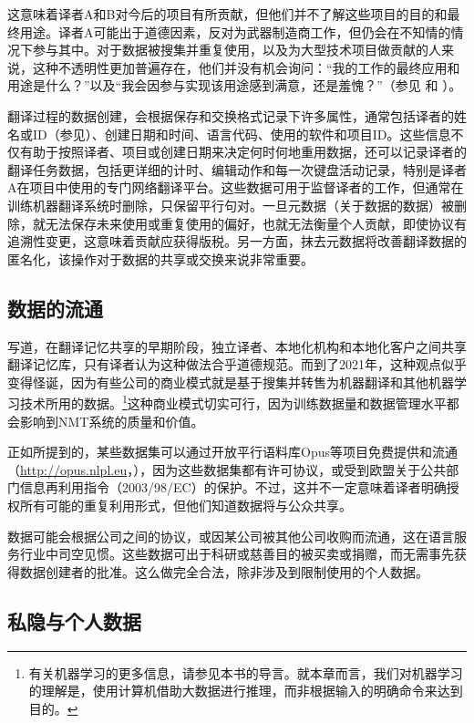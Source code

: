 \documentclass[output=paper]{langscibook}
\begin{document}
这意味着译者A和B对今后的项目有所贡献，但他们并不了解这些项目的目的和最终用途。译者A可能出于道德因素，反对为武器制造商工作，但仍会在不知情的情况下参与其中。对于数据被搜集并重复使用，以及为大型技术项目做贡献的人来说，这种不透明性更加普遍存在，他们并没有机会询问：“我的工作的最终应用和用途是什么？”以及“我会因参与实现该用途感到满意，还是羞愧？”（参见 \citealt{Moorkens2020}和 \citealt{Weizenbaum1986}）。

翻译过程的数据创建，会根据保存和交换格式记录下许多属性，通常包括译者的姓名或ID（参见）、创建日期和时间、语言代码、使用的软件和项目ID。这些信息不仅有助于按照译者、项目或创建日期来决定何时何地重用数据，还可以记录译者的翻译任务数据，包括更详细的计时、编辑动作和每一次键盘活动记录，特别是译者A在项目中使用的专门网络翻译平台。这些数据可用于监督译者的工作，但通常在训练机器翻译系统时删除，只保留平行句对。一旦元数据（关于数据的数据）被删除，就无法保存未来使用或重复使用的偏好，也就无法衡量个人贡献，即使协议有追溯性变更，这意味着贡献应获得版税。另一方面，抹去元数据将改善翻译数据的匿名化，该操作对于数据的共享或交换来说非常重要。


\subsection{数据的流通}

\citet{Topping2000}写道，在翻译记忆共享的早期阶段，独立译者、本地化机构和本地化客户之间共享翻译记忆库，只有译者认为这种做法合乎道德规范。而到了2021年，这种观点似乎变得怪诞，因为有些公司的商业模式就是基于搜集并转售为机器翻译和其他机器学习技术所用的数据。\footnote{有关机器学习的更多信息，请参见本书的导言。就本章而言，我们对机器学习的理解是，使用计算机借助大数据进行推理，而非根据输入的明确命令来达到目的。}这种商业模式切实可行，因为训练数据量和数据管理水平都会影响到NMT系统的质量和价值。

正如所提到的，某些数据集可以通过开放平行语料库Opus等项目免费提供和流通（\url{http://opus.nlpl.eu}，\citealt{Tiedemann2012}），因为这些数据集都有许可协议，或受到欧盟关于公共部门信息再利用指令（2003/98/EC）的保护。不过，这并不一定意味着译者明确授权所有可能的重复利用形式，但他们知道数据将与公众共享。

数据可能会根据公司之间的协议，或因某公司被其他公司收购而流通，这在语言服务行业中司空见惯\citep{Moorkens2020}。这些数据可出于科研或慈善目的被买卖或捐赠，而无需事先获得数据创建者的批准。这么做完全合法，除非涉及到限制使用的个人数据。


\subsection{私隐与个人数据}\label{sec:moorkens:2.5}
\end{document}
